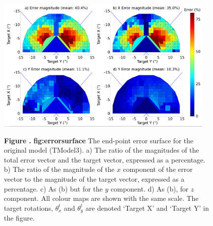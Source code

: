 \documentclass{frontiersSCNS}
\begin{document}
\begin{figure}[htb!]
\begin{center}
\includegraphics[width=0.95\textwidth]{./figures/errorsurface_TModel3.png}
\end{center}
\textbf{\label{fig:errorsurfaceTM3} Figure .}
{ \textbf{fig:errorsurface} The end-point error surface for the original model (TModel3). a) The
ratio of the magnitudes of the total error vector and the target
vector, expressed as a percentage. b) The ratio of the magnitude
of the $x$ component of the error vector to the magnitude of the
target vector, expressed as a percentage. c) As (b) but for the
$y$ component. d) As (b), for $z$ component. All colour maps are
shown with the same scale. The target rotations, $\theta_{x}^t$ and
$\theta_{y}^t$ are denoted `Target X' and `Target Y' in the figure.}
\end{figure}
\end{document}
